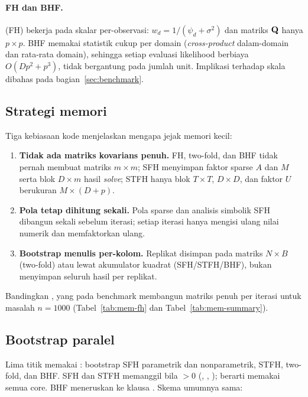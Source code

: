 \paragraph{FH dan BHF.}
 (FH) bekerja pada skalar per-observasi:
$w_d=1/(\psi_d+\sigma^2)$ dan matriks $\mathbf{Q}$ hanya $p\times p$. BHF memakai
statistik cukup per domain (\emph{cross-product} dalam-domain dan rata-rata
domain), sehingga setiap evaluasi likelihood berbiaya $O(Dp^2+p^3)$, tidak
bergantung pada jumlah unit. Implikasi terhadap skala dibahas pada
bagian~\ref{sec:benchmark}.

\subsection{Strategi memori}\label{sec:memori}

Tiga kebiasaan kode menjelaskan mengapa jejak memori  kecil:

\begin{enumerate}[label=\arabic*.]
  \item \textbf{Tidak ada matriks kovarians penuh.} FH, two-fold, dan BHF
        tidak pernah membuat matriks $m\times m$; SFH menyimpan faktor sparse
        $A$ dan $M$ serta blok $D\times m$ hasil \emph{solve}; STFH hanya blok
        $T\times T$, $D\times D$, dan faktor $U$ berukuran $M\times(D+p)$.
  \item \textbf{Pola tetap dihitung sekali.} Pola sparse dan analisis simbolik
        SFH dibangun sekali sebelum iterasi; setiap iterasi hanya mengisi
        ulang nilai numerik dan memfaktorkan ulang.
  \item \textbf{Bootstrap menulis per-kolom.} Replikat disimpan pada matriks
        $N\times B$ (two-fold) atau lewat akumulator kuadrat (SFH/STFH/BHF),
        bukan menyimpan seluruh hasil per replikat.
\end{enumerate}

Bandingkan , yang pada benchmark membangun matriks penuh per
iterasi untuk masalah $n=1000$ (Tabel~\ref{tab:mem-fh} dan
Tabel~\ref{tab:mem-summary}).

\subsection{Bootstrap paralel}\label{sec:bootstrap-paralel}

Lima titik memakai : bootstrap SFH parametrik
dan nonparametrik, STFH, two-fold, dan BHF. SFH dan STFH memanggil
 bila  $>0$
(, ,
);  berarti memakai
semua core. BHF meneruskan  ke klausa .
Skema umumnya sama:

